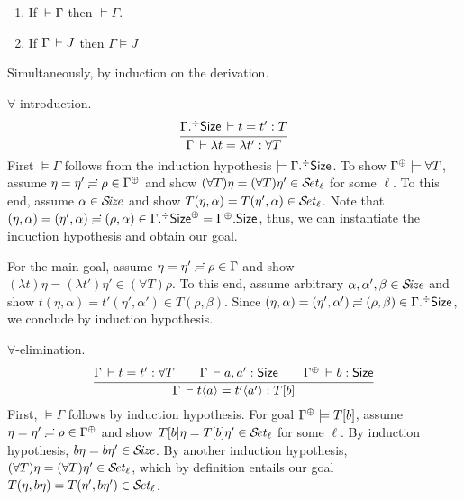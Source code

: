\documentclass[acmlarge,review,anonymous]{acmart}\settopmatter{printfolios=true}
\makeatletter
\newenvironment{proof*}[1][\proofname]{\par
  \normalfont \topsep6\p@\@plus6\p@\relax
  \trivlist
  \item[\@proofindent\hskip\labelsep
        {\@proofnamefont #1\@addpunct{.}}]\ignorespaces
}{%
  \endtrivlist\@endpefalse
}
\makeatother
\begin{document}
\begin{theorem}
  \label{thm:fund}
  \bla
  \begin{enumerate}
  \item
  If\/ $\der \Gamma$ then $\models \Gamma$.
  \item
  If\/ $\Gamma \der J$ then %
  $\Gamma \models J$
  \end{enumerate}
\end{theorem}
\begin{proof*}
Simultaneously, by induction on the derivation.

\begin{caselist}
\nextcase $\forall$-introduction.
\[
  \ru{\erext \Gamma \Size \der t = t' : T
    }{\Gamma \der \lambda t = \lambda t' : \forall T}
\]
First $\models \Gamma$ follows from the induction hypothesis $\models {\erext \Gamma \Size}$.
To show $\resurrect\Gamma \models \forall T$,
assume $\eta = \eta' \eeq \rho \in \resurrect \Gamma$
and show $(\forall T)\eta = (\forall T)\eta' \in \SET[\ell]$ for some $\ell$.
To this end, assume $\alpha \in \SIZE$ and show $T(\eta,\alpha) = T(\eta',\alpha) \in \SET[\ell]$.
Note that $(\eta,\alpha) = (\eta',\alpha) \eeq (\rho,\alpha) \in
\resurrect {\erext \Gamma \Size} = \cext {\resurrect\Gamma}\Size$,
thus, we can instantiate the induction hypothesis and obtain our goal.

For the main goal,
assume $\eta = \eta' \eeq \rho \in \Gamma$ and
show $(\lambda t)\eta = (\lambda t')\eta' \in (\forall T)\rho$.
To this end, assume arbitrary $\alpha,\alpha',\beta \in \SIZE$ and show
$t(\eta,\alpha) = t'(\eta',\alpha') \in T(\rho,\beta)$.
Since $(\eta,\alpha) = (\eta',\alpha') \eeq (\rho,\beta) \in \erext \Gamma \Size$,
we conclude by induction hypothesis.

\nextcase $\forall$-elimination.
\[
  \ru{\Gamma \der t = t' : \forall T \qquad
      \Gamma \der a, a' : \Size \qquad
      \resurrect\Gamma \der b : \Size
    }{\Gamma \der t \ann a = t' \ann {a'} : T[b]}
\]
First, $\models \Gamma$ follows by induction hypothesis.
For goal $\resurrect \Gamma \models T[b]$,
assume $\eta = \eta' \eeq \rho \in \resurrect\Gamma$ and show
$T[b]\eta = T[b]\eta' \in \SET[\ell]$ for some $\ell$.
By induction hypothesis,  $b\eta = b\eta' \in \SIZE$.
By another induction hypothesis, $(\forall T)\eta = (\forall T)\eta' \in \SET[\ell]$,
which by definition entails our goal $T(\eta, b\eta) = T(\eta', b\eta') \in \SET[\ell]$.



\end{caselist}
\end{proof*}
\end{document}
